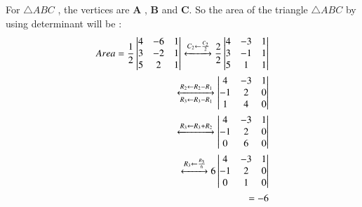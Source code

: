 For  $ \triangle ABC $ , the vertices are \textbf{A} , \textbf{B} and \textbf{C}.
So the area of the triangle $ \triangle ABC $  by using determinant will be :
\begin{equation}
\begin{aligned}
    Area = \frac{1}{2}\begin{vmatrix}
      4       & -6    & 1 \\ 
      3       & -2    & 1 \\
      5       & 2     & 1 \\
      
    \end{vmatrix} \xleftrightarrow[]{C_2\leftarrow \frac{C_2}{2}} \frac{2}{2}\begin{vmatrix}
      4       &-3    & 1 \\ 
      3       &-1    & 1 \\
      5       & 1    & 1 \\
      
    \end{vmatrix}\\
    \xleftrightarrow[R_3 \leftarrow R_3-R_1]{R_2\leftarrow R_2-R_1}
    \begin{vmatrix}
      4       & -3    & 1 \\ 
      -1       & 2    & 0 \\
      1       & 4   & 0 \\
      
    \end{vmatrix} \\ \xleftrightarrow[]{R_3\leftarrow R_3+R_2}
    \begin{vmatrix}
      4       & -3    & 1 \\ 
      -1       & 2    & 0 \\
      0       & 6   & 0 \\
      
    \end{vmatrix} \\ \xleftrightarrow[]{R_3\leftarrow \frac{R_3}{6}}
    6 \begin{vmatrix}
      4       & -3    & 1 \\ 
      -1       & 2    & 0 \\
      0       & 1   & 0 \\
      
    \end{vmatrix} \\
    =-6
   \end{aligned}
  \end{equation}
